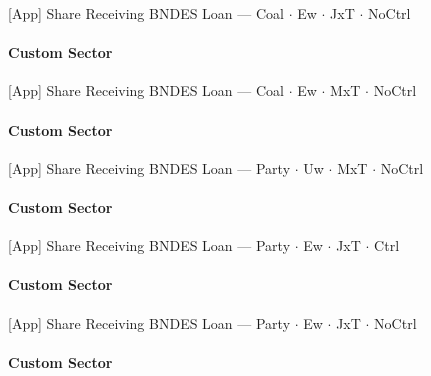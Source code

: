 \documentclass[aspectratio=169,10pt]{beamer}
\newcommand{\tgroup}{../tables/agg_firm_grouped}
\begin{document}
\begin{frame}[t,shrink=5]{[App] Share Receiving BNDES Loan --- Coal $\cdot$ Ew $\cdot$ JxT $\cdot$ NoCtrl}
\framesubtitle{Custom Sector}
\begin{center}\footnotesize

\end{center}
\end{frame}

\begin{frame}[t,shrink=5]{[App] Share Receiving BNDES Loan --- Coal $\cdot$ Ew $\cdot$ MxT $\cdot$ NoCtrl}
\framesubtitle{Custom Sector}
\begin{center}\footnotesize

\end{center}
\end{frame}

\begin{frame}[t,shrink=5]{[App] Share Receiving BNDES Loan --- Party $\cdot$ Uw $\cdot$ MxT $\cdot$ NoCtrl}
\framesubtitle{Custom Sector}
\begin{center}\footnotesize

\end{center}
\end{frame}

\begin{frame}[t,shrink=5]{[App] Share Receiving BNDES Loan --- Party $\cdot$ Ew $\cdot$ JxT $\cdot$ Ctrl}
\framesubtitle{Custom Sector}
\begin{center}\footnotesize

\end{center}
\end{frame}

\begin{frame}[t,shrink=5]{[App] Share Receiving BNDES Loan --- Party $\cdot$ Ew $\cdot$ JxT $\cdot$ NoCtrl}
\framesubtitle{Custom Sector}
\begin{center}\footnotesize

\end{center}
\end{frame}
\end{document}
